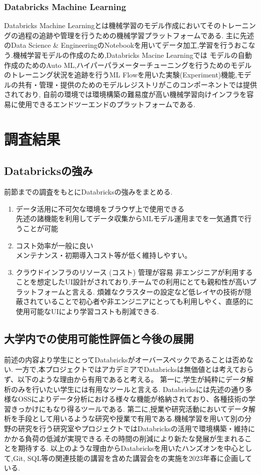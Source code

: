\documentclass[twocolumn]{jsarticle}
\begin{document}
\subsubsection{Databricks Machine Learning}
Databricks Machine Learningとは機械学習のモデル作成においてそのトレーニングの過程の追跡や管理を行うための機械学習プラットフォームである.
主に先述のData Science \& EngineeringのNotebookを用いてデータ加工,学習を行うおこなう.機械学習モデルの作成のため,Databricks Macine Learningでは
モデルの自動作成のためのAuto ML,ハイパーパラメーターチューニングを行うためのモデルのトレーニング状況を追跡を行うML Flowを用いた実験(Experiment)機能,モデルの共有・管理・提供のためのモデルレジストリがこのコンポーネントでは提供されており,
自前の環境では環境構築の難易度が高い機械学習向けインフラを容易に使用できるエンドツーエンドのプラットフォームである.
\section{調査結果}
\subsection{Databricksの強み}
前節までの調査をもとにDatabricksの強みをまとめる.\par
\begin{enumerate}
  \item データ活用に不可欠な環境をブラウザ上で使用できる \\
  先述の諸機能を利用してデータ収集からMLモデル運用までを一気通貫で行うことが可能
  \item コスト効率が一般に良い\\
  メンテナンス・初期導入コスト等が低く維持しやすい。
  \item クラウドインフラのリソース (コスト) 管理が容易
非エンジニアが利用することを想定したUI設計がされており,チームでの利用にとても親和性が高いプラットフォームと言える.
煩雑なクラスターの設定など低レイヤの技術が隠蔽されていることで初心者や非エンジニアにとっても利用しやく、直感的に使用可能なUIにより学習コストも削減できる.
\end{enumerate}
\subsection{大学内での使用可能性評価と今後の展開}
前述の内容より学生にとってDatabricksがオーバースペックであることは否めない.
一方で,本プロジェクトではアカデミアでDatabricksは無価値とは考えておらず、以下のような理由から有用であると考える。
第一に,学生が純粋にデータ解析のみを行いたい学生には有用なツールと言える.
Databricksには先述の通り多様なOSSによりデータ分析における様々な機能が格納されており、各種技術の学習きっかけにもなり得るツールである.
第二に,授業や研究活動においてデータ解析を手段として用いるような研究や授業で有用である.機械学習を用いて別の分野の研究を行う研究室やプロジェクトではDatabricksの活用で環境構築・維持にかかる負荷の低減が実現できる.その時間の削減により新たな発展が生まれることを期待する.
以上のような理由からDatabricksを用いたハンズオンを中心として,Git, SQL等の関連技能の講習を含めた講習会をの実施を2023年春に企画している.
\end{document}
